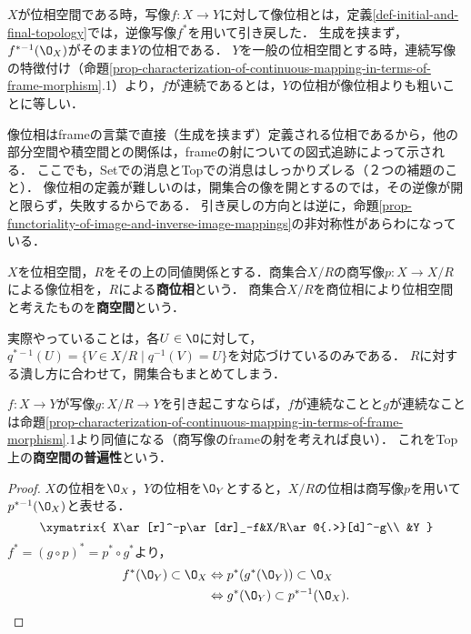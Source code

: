 \documentclass[uplatex,dvipdfmx]{jsreport}
\begin{document}
\begin{tcolorbox}[colframe=ForestGreen, colback=ForestGreen!10!white, breakable ,colbacktitle=ForestGreen!40!white, coltitle=black,fonttitle=\bfseries\sffamily
    ,title=商空間には，商写像の逆像が開になりえるものは全部開と定める位相を入れる．これはfinestなfinal topologyを定める．]
    $X$が位相空間である時，写像$f:X\to Y$に対して像位相とは，定義\ref{def-initial-and-final-topology}では，逆像写像$f^*$を用いて引き戻した．
    生成を挟まず，$f^{*-1}(\O_X)$がそのまま$Y$の位相である．
    $Y$を一般の位相空間とする時，連続写像の特徴付け（命題\ref{prop-characterization-of-continuous-mapping-in-terms-of-frame-morphism}.1）より，$f$が連続であるとは，$Y$の位相が像位相よりも粗いことに等しい．
    
    像位相はframeの言葉で直接（生成を挟まず）定義される位相であるから，他の部分空間や積空間との関係は，frameの射についての図式追跡によって示される．
    ここでも，Setでの消息とTopでの消息はしっかりズレる（２つの補題のこと）．
    像位相の定義が難しいのは，開集合の像を開とするのでは，その逆像が開と限らず，失敗するからである．
    引き戻しの方向とは逆に，命題\ref{prop-functoriality-of-image-and-inverse-image-mappings}の非対称性があらわになっている．
\end{tcolorbox}

\begin{definition}
    $X$を位相空間，$R$をその上の同値関係とする．商集合$X/R$の商写像$p:X\to X/R$による像位相を，$R$による\textbf{商位相}という．
    商集合$X/R$を商位相により位相空間と考えたものを\textbf{商空間}という．
\end{definition}
\begin{remarks}
    実際やっていることは，各$U\in\O$に対して，$q^{*-1}(U)=\{V\in X/R\mid q^{-1}(V)=U\}$を対応づけているのみである．
    $R$に対する潰し方に合わせて，開集合もまとめてしまう．
\end{remarks}

\begin{proposition}
    $f:X\to Y$が写像$g:X/R\to Y$を引き起こすならば，$f$が連続なことと$g$が連続なことは命題\ref{prop-characterization-of-continuous-mapping-in-terms-of-frame-morphism}.1より同値になる（商写像のframeの射を考えれば良い）．
    これをTop上の\textbf{商空間の普遍性}という．
\end{proposition}
\begin{proof}
    $X$の位相を$\O_X$，$Y$の位相を$\O_Y$とすると，$X/R$の位相は商写像$p$を用いて$p^{*-1}(\O_X)$と表せる．
    \[\xymatrix{
        X\ar[r]^-p\ar[dr]_-f&X/R\ar@{.>}[d]^-g\\
        &Y
    }\]
    $f^*=(g\circ p)^*=p^*\circ g^*$より，
    \begin{align*}
        f^*(\O_Y)\subset\O_X&\Leftrightarrow p^*(g^*(\O_Y))\subset\O_X\\
        &\Leftrightarrow g^*(\O_Y)\subset p^{*-1}(\O_X).
    \end{align*}
\end{proof}
\end{document}
